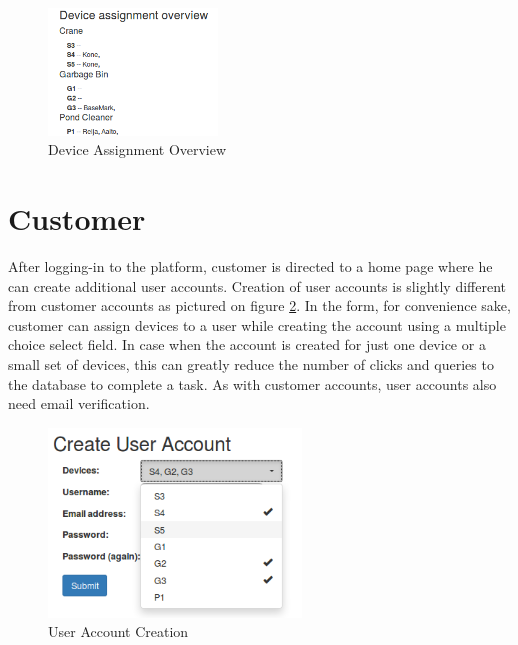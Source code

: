 \begin{figure}[ht]
	\begin{center}
		\includegraphics[width=0.4\textwidth]{images/implementation/DeviceAssignment}
		\caption{Device Assignment Overview}
		\label{fig:DeviceAssignment}
	\end{center}
\end{figure}


\section{Customer}
\label{section:customer}

 After logging-in to the platform, customer is directed to a home page where he can create additional user accounts. Creation of user accounts is slightly different from customer accounts as pictured on figure \ref{fig:CreateUser}. In the form, for convenience sake, customer can assign devices to a user while creating the account using a multiple choice select field. In case when the account is created for just one device or a small set of devices, this can greatly reduce the number of clicks and queries to the database to complete a task. As with customer accounts, user accounts also need email verification.

\begin{figure}[ht]
	\begin{center}
		\includegraphics[width=0.6\textwidth]{images/implementation/CreateUser}
		\caption{User Account Creation}
		\label{fig:CreateUser}
	\end{center}
\end{figure}

